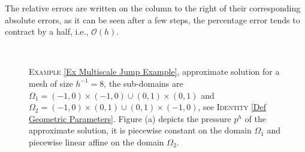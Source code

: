 \documentclass[3p]{elsarticle}
\def\u{\mathbf u}
\def\Hdiv{\mathbf{H_{div}}}
\begin{document}
\begin{example}
The relative errors are written on the column to the right of their corresponding absolute errors, as it can be seen after a few steps, the percentage error tends to contract by a half, i.e., $ \mathcal{O}(h) $.  
%
%
\begin{figure}[h] %
	\centering
	\begin{subfigure}
	[Pressure Approximate Solution. ]
		{\resizebox{7.8cm}{8.0cm}
			{\texttt{[image: Multiscale\_HighGrad\_Error\_Pressure.pdf]} } 
			}
	\end{subfigure} %
	~ %
	\begin{subfigure}[Flux Approximate Solution.]
		{\resizebox{7.8cm}{8.0cm}
			{\texttt{[image: Multiscale\_HighGrad\_Error\_Velocity.pdf]} } 
			}                
	\end{subfigure} %
	\caption{\textsc{Example} \ref{Ex Multiscale Jump Example}, approximate solution for a mesh of size $ h^{-1} = 8 $, the sub-domains are $\Omega_{1} = (-1, 0) \times (-1, 0)\cup  (0, 1) \times  (0, 1)$ and $\Omega_2 =  (-1, 0) \times (0, 1)\cup  (0, 1) \times  (-1, 0)$, see \textsc{Identity} \eqref{Def Geometric Parameters}.  Figure (a) depicts the pressure $p^{h}$ of the approximate solution, it is piecewise constant on the domain $\Omega_{1} $ and piecewise linear affine on the domain $\Omega_2$.
}
\end{figure}
\end{example}
\end{document}
